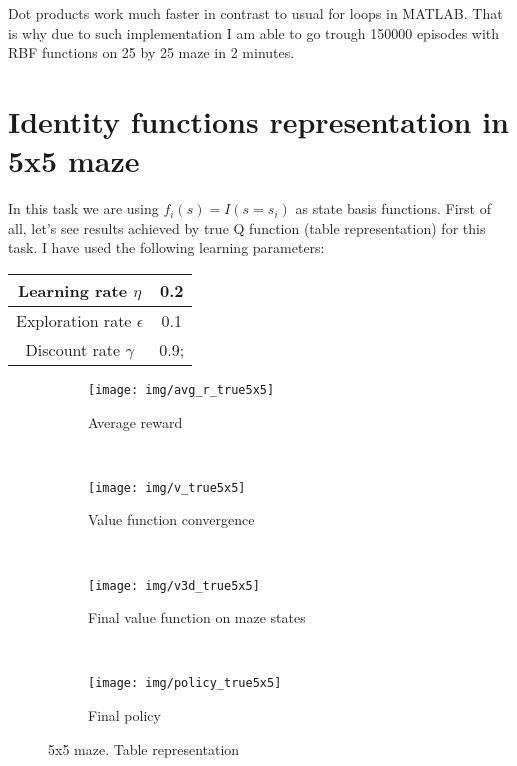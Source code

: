 \documentclass[a4paper,11pt]{article}
\theoremstyle{mytheor}
\begin{document}
Dot products work much faster in contrast to usual for loops in MATLAB. That is why due to such implementation I am able to go trough 150000 episodes with RBF functions on 25 by 25 maze in 2 minutes. 
















\section{Identity functions representation in 5x5 maze}
In this task we are using $f_{i}(s)=I(s=s_i)$ as state basis functions.
First of all, let's see results achieved by true Q function (table representation) for this task.
I have used the following learning parameters:
\begin{center}
	\begin{tabular}{| c | c | }
		\hline
		Learning rate $\eta$ &  0.2 \\ 
		\hline
		Exploration rate $\epsilon$ & 0.1 \\ 
		\hline
		Discount rate $\gamma$ & 0.9; \\
		\hline
	\end{tabular}
\end{center}

\begin{figure}[htbp!]
 \centering
 \begin{subfigure}[t]{0.49\textwidth}
 	\texttt{[image: img/avg\_r\_true5x5]}
 	\caption{Average reward}
 	\label{fig:avg_r_true5x5}
 \end{subfigure}
 ~
 \centering
 \begin{subfigure}[t]{0.49\textwidth}
 	\texttt{[image: img/v\_true5x5]}
 	\caption{Value function convergence}
 	\label{fig:v_true5x5}
 \end{subfigure}
 \\
 \centering
 \begin{subfigure}[t]{0.49\textwidth}
 	\texttt{[image: img/v3d\_true5x5]}
 	\caption{Final value function on maze states}
 	\label{fig:v3d_true5x5}
 \end{subfigure} 
 ~
 \centering
 \begin{subfigure}[t]{0.49\textwidth}
 	\texttt{[image: img/policy\_true5x5]}
 	\caption{Final policy}
 	\label{fig:policy_true5x5}
 \end{subfigure} 	
 \caption{5x5 maze. Table representation}
 \label{fig:true5x5}
\end{figure}
\end{document}
